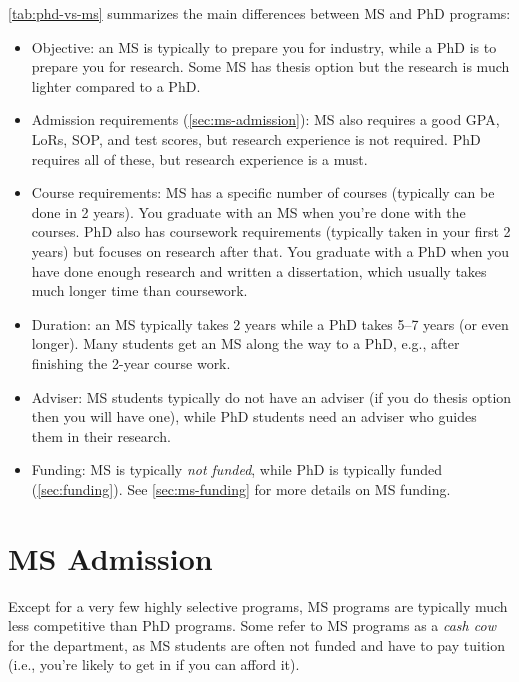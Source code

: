 \documentclass[oneside,11pt,dvipsnames]{book}
\begin{document}
\autoref{tab:phd-vs-ms} summarizes the main differences between MS and PhD programs:
\begin{itemize}

  \item Objective: an MS is typically to prepare you for industry, while a PhD is to prepare you for research. Some MS has thesis option but the research is much lighter compared to a PhD.

  \item Admission requirements (\autoref{sec:ms-admission}): MS also requires a good GPA, LoRs, SOP, and test scores, but research experience is not required.  PhD requires all of these, but research experience is a must.
  
  \item Course requirements: MS has a specific number of courses (typically can be done in 2 years). You graduate with an MS when you're done with the courses. PhD also has coursework requirements (typically taken in your first 2 years) but focuses on research after that.  You graduate with a PhD when you have done enough research and written a dissertation, which usually takes much longer time than coursework.
  
  \item Duration: an MS typically takes 2 years while a PhD takes 5--7 years (or even longer).  Many students get an MS along the way to a PhD, e.g., after finishing the 2-year course work.
  
  \item Adviser: MS students typically do not have an adviser (if you do thesis option then you will have one), while PhD students need an adviser who guides them in their research.
  
  \item Funding: MS is typically \emph{not funded}, while PhD is typically funded (\autoref{sec:funding}). See \autoref{sec:ms-funding} for more details on MS funding.
  
\end{itemize}

\section{MS Admission}\label{sec:ms-admission}

Except for a very few highly selective programs, MS programs are typically much less competitive than PhD programs. Some refer to MS programs as a \emph{cash cow} for the department, as MS students are often not funded and have to pay tuition (i.e., you're likely to get in if you can afford it).
\end{document}
